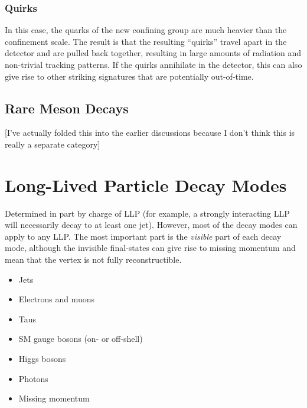 \subsubsection{Quirks}

In this case, the quarks of the new confining group are much heavier than the confinement scale. The result is that the resulting ``quirks'' travel apart in the detector and are pulled back together, resulting in large amounts of radiation and non-trivial tracking patterns. If the quirks annihilate in the detector, this can also give rise to other striking signatures that are potentially out-of-time.

\subsection{Rare Meson Decays}

[I've actually folded this into the earlier discussions because I don't think this is really a separate category]

\section{Long-Lived Particle Decay Modes}

Determined in part by charge of LLP (for example, a strongly interacting LLP will necessarily decay to at least one jet). However, most of the decay modes can apply to any LLP. The most important part is the \emph{visible} part of each decay mode, although the invisible final-states can give rise to missing momentum and mean that the vertex is not fully reconstructible.

\begin{itemize}
\item Jets
\item Electrons and muons
\item Taus
\item SM gauge bosons (on- or off-shell)
\item Higgs bosons
\item Photons
\item Missing momentum
\end{itemize}


